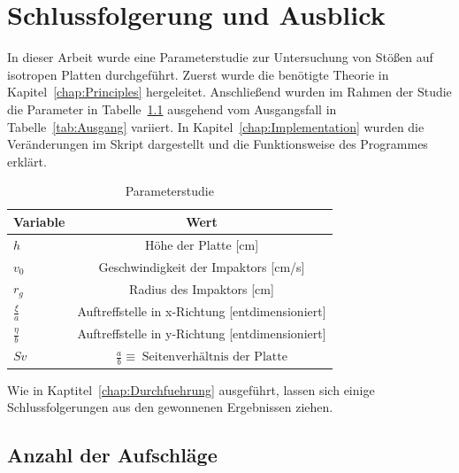 \chapter{Schlussfolgerung und Ausblick}
\label{Conclusion}

In dieser Arbeit wurde eine Parameterstudie zur Untersuchung von Stößen auf isotropen Platten durchgeführt. Zuerst wurde die benötigte Theorie in Kapitel~\ref{chap:Principles} hergeleitet. Anschließend wurden im Rahmen der Studie die Parameter in Tabelle~\ref{tab:VariierteParams} ausgehend vom Ausgangsfall in Tabelle~\ref{tab:Ausgang} variiert. In Kapitel~\ref{chap:Implementation} wurden die Veränderungen im Skript dargestellt und die Funktionsweise des Programmes erklärt. 

\begin{table}[H]
	\begin{center}
		\caption{Parameterstudie}
		\label{tab:VariierteParams}
		\begin{tabular}{l|c}
			\textbf{Variable} & \textbf{Wert}\\
			\hline
			$h$ & Höhe der Platte [cm]\\
			$v_{0}$ & Geschwindigkeit der Impaktors [cm/s]\\
			$r_{g}$ & Radius des Impaktors [cm]\\
			$\frac{\xi}{a}$ & Auftreffstelle in x-Richtung [entdimensioniert]\\
			$\frac{\eta}{b}$ & Auftreffstelle in y-Richtung [entdimensioniert]\\
			$Sv$ & $\frac{a}{b} \equiv \; \mbox{Seitenverhältnis der Platte}$ \\		
		\end{tabular}
	\end{center}
\end{table}

Wie in Kaptitel~\ref{chap:Durchfuehrung} ausgeführt, lassen sich einige Schlussfolgerungen aus den gewonnenen Ergebnissen ziehen. \\

\section{Anzahl der Aufschläge}
\label{sec:Aufschlag}

